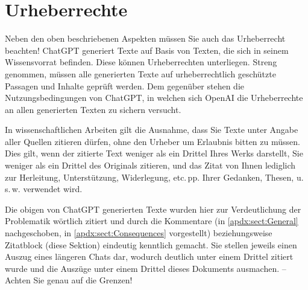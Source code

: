 \section{Urheberrechte}\label{apdx:sect:Copyright}
Neben den oben beschriebenen Aspekten müssen Sie auch das Urheberrecht beachten! Chat\-GPT generiert Texte auf Basis von Texten, die sich in seinem Wissensvorrat befinden. Diese können Urheberrechten unterliegen. Streng genommen, müssen alle generierten Texte auf urheberrechtlich geschützte Passagen und Inhalte geprüft werden. Dem gegenüber stehen die Nutzungsbedingungen von ChatGPT, in welchen sich OpenAI die Urheberrechte an allen generierten Texten zu sichern versucht.

In wissenschaftlichen Arbeiten gilt die Ausnahme, dass Sie Texte unter Angabe aller Quellen zitieren dürfen, ohne den Urheber um Erlaubnis bitten zu müssen. Dies gilt, wenn der zitierte Text weniger als ein Drittel Ihres Werks darstellt, Sie weniger als ein Drittel des Originals zitieren, und das Zitat von Ihnen lediglich zur Herleitung, Unterstützung, Widerlegung, etc.\,pp. Ihrer Gedanken, Thesen, u.\,s.\,w. verwendet wird.

Die obigen von ChatGPT generierten Texte wurden hier zur Verdeutlichung der Problematik wörtlich zitiert und durch die Kommentare (in \ref{apdx:sect:General} nachgeschoben, in \ref{apdx:sect:Consequences} vorgestellt) beziehungsweise Zitatblock (diese Sektion) eindeutig kenntlich gemacht. Sie stellen jeweils einen Auszug eines längeren Chats dar, wodurch deutlich unter einem Drittel zitiert wurde und die Auszüge unter einem Drittel dieses Dokuments ausmachen. --\,Achten Sie genau auf die Grenzen!